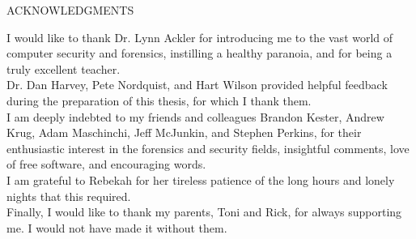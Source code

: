 \onehalfspacing
\begin{center}
ACKNOWLEDGMENTS \\[36pt]
\end{center}

\noindent
I would like to thank Dr. Lynn Ackler for introducing me to the vast world of computer security and forensics, instilling a healthy
paranoia, and for being a truly excellent teacher.  \\[12pt]

\noindent 
Dr. Dan Harvey, Pete Nordquist, and Hart Wilson provided helpful feedback during the preparation of this thesis, for which
I thank them. \\[12pt]

\noindent
I am deeply indebted to my friends and colleagues Brandon Kester, Andrew Krug, Adam Maschinchi, Jeff McJunkin, and Stephen Perkins,
for their enthusiastic interest in the forensics and security fields, insightful comments, love of free software, and encouraging
words. \\[12pt]
 
\noindent
I am grateful to Rebekah for her tireless patience of the long hours and lonely nights that this required. \\[12pt]
 
\noindent
Finally, I would like to thank my parents, Toni and Rick, for always supporting me. I would not have made it without them. \\[12pt]

\restoregeometry
